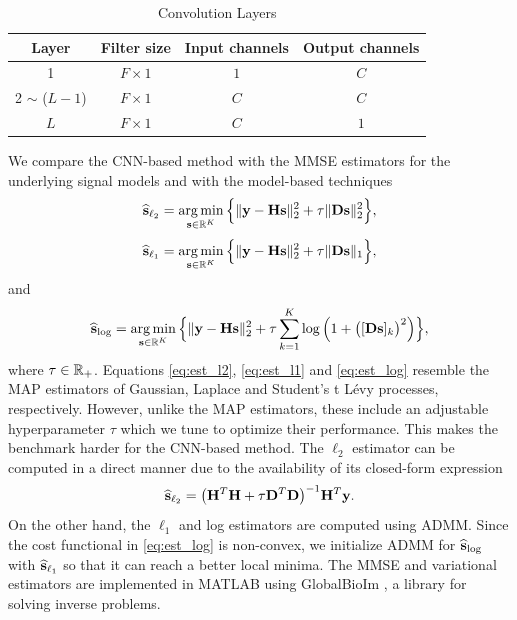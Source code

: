 \documentclass[journal]{IEEEtran}
\begin{document}
\begin{table}[t]
\caption{Convolution Layers}
\label{table:conv_layers}
\setlength{\tabcolsep}{3pt}
\renewcommand{\arraystretch}{1.5}
\centering
\begin{tabular}[c]{c| c | c | c}
\hline \hline
Layer  & Filter size & {Input channels} & Output channels  \\ \hline 
1 & $F \times 1$ & $1$ & $C$ \\
2 $\sim$ ($L-1$) & $F \times 1$ & $C$ & $C$  \\ 
$L$ & $F \times 1$ & $C$ & $1$  \\ \hline \hline 
\end{tabular}
\end{table}

We compare the CNN-based method with the MMSE estimators for the underlying signal models and with the model-based techniques 
\begin{equation}\label{eq:est_l2}
    \widehat{{\bf{s}}}_{\ell_2} = \operatorname*{arg\,min}_{{\bf{s}} \in \mathbb{R}^K} \Big\{\|{\bf{y}} - {\bf{H}} {\bf{s}}\|_{2}^{2} + \tau \|{\bf{D}} {\bf{s}}\|_{2}^{2} \Big\},
\end{equation}
\begin{equation}\label{eq:est_l1}
    \widehat{{\bf{s}}}_{\ell_1} = \operatorname*{arg\,min}_{{\bf{s}} \in \mathbb{R}^K} \Big\{\|{\bf{y}} - {\bf{H}} {\bf{s}}\|_{2}^{2} + \tau \|{\bf{D}} {\bf{s}}\|_{1} \Big\},
\end{equation}
and
\begin{equation}\label{eq:est_log}
    \widehat{{\bf{s}}}_{\text{log}} = \operatorname*{arg\,min}_{{\bf{s}} \in \mathbb{R}^K} \Big\{\|{\bf{y}} - {\bf{H}} {\bf{s}}\|_{2}^{2} + \tau \sum_{k=1}^{K} \log \Big(1 + \big([{\bf{D}} {\bf{s}}]_k\big)^{2}\Big) \Big\},
\end{equation}
where $\tau \in \mathbb{R}_{+}$. Equations \eqref{eq:est_l2}, \eqref{eq:est_l1} and \eqref{eq:est_log} resemble the MAP estimators of Gaussian, Laplace and Student's t L\'{e}vy processes, respectively. However, unlike the MAP estimators, these include an adjustable hyperparameter $\tau$ which we tune to optimize their performance. This makes the benchmark harder for the CNN-based method. The $\ell_2$ estimator can be computed in a direct manner due to the availability of its closed-form expression
\begin{equation}
    \widehat{{\bf{s}}}_{\ell_2} = \big({\bf{H}}^{T} {\bf{H}} + \tau {\bf{D}}^{T} {\bf{D}} \big)^{-1} {\bf{H}}^{T} {\bf{y}}.
\end{equation}
On the other hand, the $\ell_1$ and log estimators are computed using ADMM. Since the cost functional in \eqref{eq:est_log} is non-convex, we initialize ADMM for $\widehat{{\bf{s}}}_{\text{log}}$ with $\widehat{{\bf{s}}}_{\ell_1}$ so that it can reach a better local minima. The MMSE and variational estimators are implemented in MATLAB using GlobalBioIm \cite{soubies2019pocket}, a library for solving inverse problems.
\end{document}
